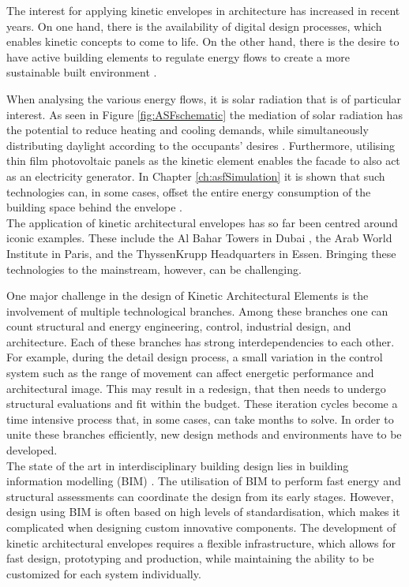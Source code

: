 
The interest for applying kinetic envelopes in architecture has increased in recent years. On one hand, there is the availability of digital design processes, which enables kinetic concepts to come to life. On the other hand, there is the desire to have active building elements to regulate energy flows to create a more sustainable built environment \cite{loonen2013climate}. 

When analysing the various energy flows, it is solar radiation that is of particular interest. As seen in Figure \ref{fig:ASFschematic} the mediation of solar radiation has the potential to reduce heating and cooling demands, while simultaneously distributing daylight according to the occupants' desires \cite{nagy2016adaptive}. Furthermore, utilising thin film photovoltaic panels as the kinetic element enables the facade to also act as an electricity generator. In Chapter \ref{ch:asfSimulation} it is shown that such technologies can, in some cases, offset the entire energy consumption of the building space behind the envelope \cite{jayathissa2017optimising}. \\

The application of kinetic architectural envelopes has so far been centred around iconic examples. These include the Al Bahar Towers in Dubai \cite{oborn2012bahr}, the Arab World Institute in Paris, and the ThyssenKrupp Headquarters in Essen. Bringing these technologies to the mainstream, however, can be challenging. 

One major challenge in the design of Kinetic Architectural Elements is the involvement of multiple technological branches. Among these branches one can count structural and energy engineering, control, industrial design, and architecture. Each of these branches has strong interdependencies to each other. For example, during the detail design process, a small variation in the control system such as the range of movement can affect energetic performance and architectural image. This may result in a redesign, that then needs to undergo structural evaluations and fit within the budget. These iteration cycles become a time intensive process that, in some cases, can take months to solve. In order to unite these branches efficiently, new design methods and environments have to be developed. \\

The state of the art in interdisciplinary building design lies in building information modelling (BIM) \cite{schlueter2009building, volk2014building}. The utilisation of BIM to perform fast energy and structural assessments can coordinate the design from its early stages. However, design using BIM is often based on high levels of standardisation, which makes it complicated when designing custom innovative components. The development of kinetic architectural envelopes requires a flexible infrastructure, which allows for fast design, prototyping and production, while maintaining the ability to be customized for each system individually. 

